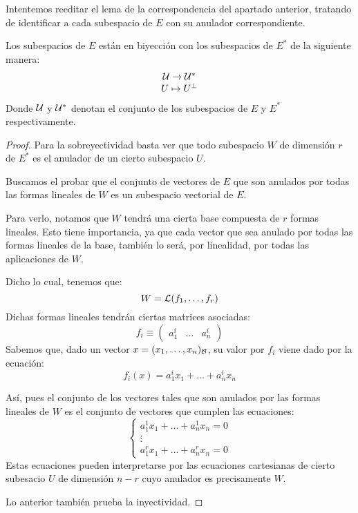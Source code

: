 Intentemos reeditar el lema de la correspondencia del apartado anterior, tratando de identificar a cada subespacio de $E$ con su anulador correspondiente.
\begin{lem}
	\label{C2_lem_correspondenciaAnulador}
	Los subespacios de $E$ están en biyección con los subespacios de $E^*$ de la siguiente manera:
	\[\begin{array}{c}
	\mathcal{U}\to\mathcal{U}^*\\
	U\mapsto U^{\perp}
	\end{array}\]
	Donde $\mathcal{U}$ y $\mathcal{U}^*$ denotan el conjunto de los subespacios de $E$ y $E^*$ respectivamente.
\end{lem}
\begin{proof}
	Para la sobreyectividad basta ver que todo subespacio $W$ de dimensión $r$ de $E^*$ es el anulador de un cierto subespacio $U$.
	
	Buscamos el probar que el conjunto de vectores de $E$ que son anulados por todas las formas lineales de $W$ es un subespacio vectorial de $E$.
	
	Para verlo, notamos que $W$ tendrá una cierta base compuesta de $r$ formas lineales. Esto tiene importancia, ya que cada vector que sea anulado por todas las formas lineales de la base, también lo será, por linealidad, por todas las aplicaciones de $W$.
	
	Dicho lo cual, tenemos que:
	\[W=\mathcal{L}(f_1,\dots,f_r)\]
	Dichas formas lineales tendrán ciertas matrices asociadas:
	\[f_i\equiv\begin{pmatrix}
	a_1^i & \dots & a_n^i
	\end{pmatrix}\]
	Sabemos que, dado un vector $x=(x_1,\dots,x_n)_{\mathcal{B}}$, su valor por $f_i$ viene dado por la ecuación:
	\[f_i(x)=a_1^ix_1+\dots+a_n^ix_n\]
	
	Así, pues el conjunto de los vectores tales que son anulados por las formas lineales de $W$ es el conjunto de vectores que cumplen las ecuaciones:
	\[\begin{cases}
	a_1^1x_1+\dots+a_n^1x_n=0\\
	\vdots\\
	a_1^rx_1+\dots+a_n^rx_n=0
	\end{cases}\]
	Estas ecuaciones pueden interpretarse por las ecuaciones cartesianas de cierto subesacio $U$ de dimensión $n-r$ cuyo anulador es precisamente $W$.
	
	Lo anterior también prueba la inyectividad.
\end{proof}


